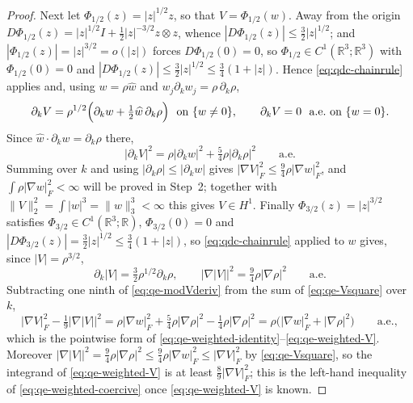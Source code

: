 \documentclass[11pt]{article}
\theoremstyle{definition}
\theoremstyle{plain}
\newcommand{\R}{\mathbb R}
\newcommand{\norm}[1]{\lVert #1\rVert}
\begin{document}
\begin{proof}
Next let $\Phi_{1/2}(z)=|z|^{1/2}z$, so that $V=\Phi_{1/2}(w)$.  Away from
the origin
$D\Phi_{1/2}(z)=|z|^{1/2}I+\frac12|z|^{-3/2}z\otimes z$, whence
$|D\Phi_{1/2}(z)|\le\frac32|z|^{1/2}$; and
$|\Phi_{1/2}(z)|=|z|^{3/2}=o(|z|)$ forces $D\Phi_{1/2}(0)=0$, so
$\Phi_{1/2}\in C^1(\R^3;\R^3)$ with $\Phi_{1/2}(0)=0$ and
$|D\Phi_{1/2}(z)|\le\frac32|z|^{1/2}\le\frac34(1+|z|)$.  Hence
\eqref{eq:qdc-chainrule} applies and, using $w=\rho\widehat w$ and
$w_j\partial_kw_j=\rho\,\partial_k\rho$,
\begin{equation}\label{eq:qe-Vderiv}
 \partial_kV=\rho^{1/2}\Bigl(\partial_kw+\tfrac12\widehat w\,\partial_k\rho\Bigr)
 \ \text{ on }\{w\ne0\},
 \qquad \partial_kV=0\ \text{ a.e.\ on }\{w=0\}.
\end{equation}
Since $\widehat w\cdot\partial_kw=\partial_k\rho$ there,
\begin{equation}\label{eq:qe-Vsquare}
 |\partial_kV|^2=\rho|\partial_kw|^2+\tfrac54\rho|\partial_k\rho|^2
 \qquad\text{a.e.}
\end{equation}
Summing over $k$ and using $|\partial_k\rho|\le|\partial_kw|$ gives
$|\nabla V|_F^2\le\frac94\rho|\nabla w|_F^2$, and
$\int\rho|\nabla w|_F^2<\infty$ will be proved in Step~2; together with
$\norm V_2^2=\int|w|^3=\norm w_3^3<\infty$ this gives $V\in H^1$.
Finally $\Phi_{3/2}(z)=|z|^{3/2}$ satisfies $\Phi_{3/2}\in C^1(\R^3;\R)$,
$\Phi_{3/2}(0)=0$ and $|D\Phi_{3/2}(z)|=\frac32|z|^{1/2}\le\frac34(1+|z|)$,
so \eqref{eq:qdc-chainrule} applied to $w$ gives, since $|V|=\rho^{3/2}$,
\begin{equation}\label{eq:qe-modVderiv}
 \partial_k|V|=\tfrac32\rho^{1/2}\partial_k\rho,
 \qquad
 \bigl|\nabla|V|\bigr|^2=\tfrac94\rho|\nabla\rho|^2\qquad\text{a.e.}
\end{equation}
Subtracting one ninth of \eqref{eq:qe-modVderiv} from the sum of
\eqref{eq:qe-Vsquare} over $k$,
\begin{equation}\label{eq:qe-pointwise-V}
 |\nabla V|_F^2-\tfrac19\bigl|\nabla|V|\bigr|^2
 =\rho|\nabla w|_F^2+\tfrac54\rho|\nabla\rho|^2-\tfrac14\rho|\nabla\rho|^2
 =\rho\bigl(|\nabla w|_F^2+|\nabla\rho|^2\bigr)\qquad\text{a.e.},
\end{equation}
which is the pointwise form of
\eqref{eq:qe-weighted-identity}--\eqref{eq:qe-weighted-V}.  Moreover
$\bigl|\nabla|V|\bigr|^2=\frac94\rho|\nabla\rho|^2\le\frac94\rho|\nabla w|_F^2
\le|\nabla V|_F^2$ by \eqref{eq:qe-Vsquare}, so the integrand of
\eqref{eq:qe-weighted-V} is at least $\frac89|\nabla V|_F^2$; this is the
left-hand inequality of \eqref{eq:qe-weighted-coercive} once
\eqref{eq:qe-weighted-V} is known.


\end{proof}
\end{document}

